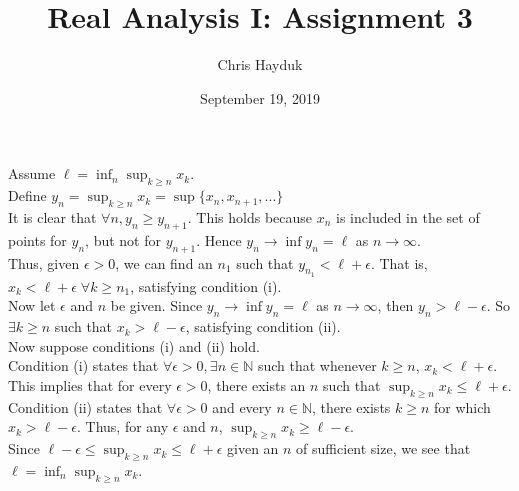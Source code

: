 \documentclass[12pt]{article}
\newenvironment{problem}[2][Problem]{\begin{trivlist}
\item[\hskip \labelsep {\bfseries #1}\hskip \labelsep {\bfseries #2.}]}{\end{trivlist}}
\begin{document}
\title{Real Analysis I: Assignment 3}

\author{Chris Hayduk}
\date{September 19, 2019}

\maketitle

\begin{problem}{1}
\end{problem}

Assume $\ell = \inf_{n} \sup_{k \geq n} x_k$.\\

Define $y_n = \sup_{k \geq n} x_k = \sup \{x_n, x_{n+1}, ...\}$\\

It is clear that $\forall n, y_n \geq y_{n+1}$. This holds because $x_n$ is included in the set of points for $y_n$, but not for $y_{n+1}$. Hence $y_n \to \inf y_n = \ell$ as $n \to \infty$.\\

Thus, given $\epsilon > 0$, we can find an $n_1$ such that $y_{n_1} < \ell + \epsilon$. That is, $x_k < \ell + \epsilon \; \forall k \geq n_1$, satisfying condition (i).\\

Now let $\epsilon$ and $n$ be given. Since $y_n \to \inf y_n = \ell$ as $n \to \infty$, then $y_n > \ell - \epsilon$. So $\exists k \geq n$ such that $x_k > \ell - \epsilon$, satisfying condition (ii).\\

Now suppose conditions (i) and (ii) hold.\\

Condition (i) states that $\forall \epsilon > 0, \exists n \in \mathbb{N}$ such that whenever $k \geq n$, $x_k < \ell + \epsilon$. This implies that for every $\epsilon > 0$, there exists an $n$ such that $\sup_{k \geq n} x_k \leq \ell + \epsilon$.\\

Condition (ii) states that $\forall \epsilon > 0$ and every $n \in \mathbb{N}$, there exists $k \geq n$ for which $x_k > \ell - \epsilon$. Thus, for any $\epsilon$ and $n$, $\sup_{k \geq n} x_k \geq \ell - \epsilon$.\\

Since $\ell - \epsilon \leq \sup_{k \geq n} x_k \leq \ell + \epsilon$ given an $n$ of sufficient size, we see that $\ell = \inf_{n} \sup_{k \geq n} x_k$. 

\begin{problem}{2}
\end{problem}
\end{document}
